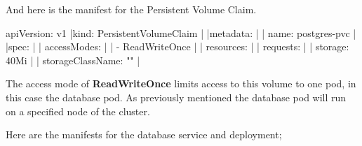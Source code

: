 \noindent And here is the manifest for the Persistent Volume Claim.

\ms

\beginlines apiVersion: v1
|kind: PersistentVolumeClaim  |
|metadata:                    |
|  name: postgres-pvc         |
|spec:                        |
|  accessModes:               |
|    - ReadWriteOnce          |
|  resources:                 |
|    requests:                |
|      storage: 40Mi          |
|  storageClassName: ""       |
\endlines

\ms

The access mode of {\bf ReadWriteOnce} limits access to this volume to one pod, in this case the database pod.
As previously mentioned the database  pod will run on a specified node of the cluster.

\noindent
Here are the manifests for the database service and deployment;

